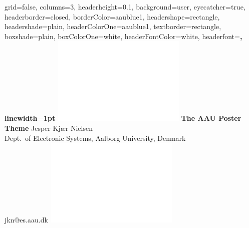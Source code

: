 \documentclass[a0paper,portrait]{baposter}
\begin{document}
\begin{poster}{
  grid=false,
  columns=3,
  headerheight=0.1\textheight,
  background=user,
  eyecatcher=true,
  headerborder=closed,
  borderColor=aaublue1,
  headershape=rectangle,
  headershade=plain,
  headerColorOne=aaublue1,
  textborder=rectangle,
  boxshade=plain,
  boxColorOne=white,
  headerFontColor=white,
  headerfont=\Large\sf\bf,
  linewidth=1pt
}
{
  \includegraphics[height=0.75\headerheight]{aau_logo_new_neg}
}
{\color{white}\bf
  The AAU Poster Theme
}
{\color{white}\small
  \vspace{1em} Jesper Kjær Nielsen\\[0.5em]
  Dept.\ of Electronic Systems, Aalborg University, Denmark\\
  jkn@es.aau.dk
}
{
  \includegraphics[height=0.75\headerheight]{aau_logo_new_neg}
}



\end{poster}
\end{document}
